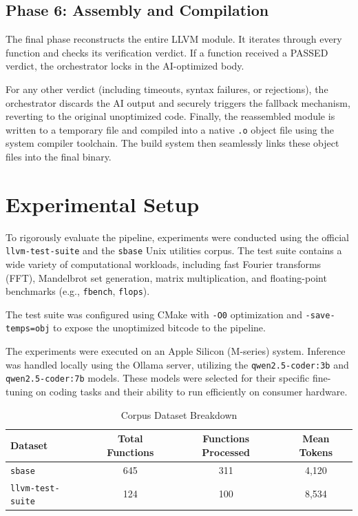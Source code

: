 \documentclass[conference,10pt]{IEEEtran}
\begin{document}
\subsection{Phase 6: Assembly and Compilation}
The final phase reconstructs the entire LLVM module. It iterates through every function and checks its verification verdict. If a function received a PASSED verdict, the orchestrator locks in the AI-optimized body. 

For any other verdict (including timeouts, syntax failures, or rejections), the orchestrator discards the AI output and securely triggers the fallback mechanism, reverting to the original unoptimized code. Finally, the reassembled module is written to a temporary file and compiled into a native \texttt{.o} object file using the system compiler toolchain. The build system then seamlessly links these object files into the final binary.

\section{Experimental Setup}
To rigorously evaluate the pipeline, experiments were conducted using the official \texttt{llvm-test-suite} and the \texttt{sbase} Unix utilities corpus. The test suite contains a wide variety of computational workloads, including fast Fourier transforms (FFT), Mandelbrot set generation, matrix multiplication, and floating-point benchmarks (e.g., \texttt{fbench}, \texttt{flops}). 

The test suite was configured using CMake with \texttt{-O0} optimization and \texttt{-save-temps=obj} to expose the unoptimized bitcode to the pipeline.

The experiments were executed on an Apple Silicon (M-series) system. Inference was handled locally using the Ollama server, utilizing the \texttt{qwen2.5-coder:3b} and \texttt{qwen2.5-coder:7b} models. These models were selected for their specific fine-tuning on coding tasks and their ability to run efficiently on consumer hardware.

\begin{table}[htbp]
\caption{Corpus Dataset Breakdown}
\label{tab:datasets}
\begin{center}
\begin{tabular}{|l|c|c|c|}
\hline
\textbf{Dataset} & \textbf{Total Functions} & \textbf{Functions Processed} & \textbf{Mean Tokens} \\
\hline
\texttt{sbase} & 645 & 311 & 4,120 \\
\texttt{llvm-test-suite} & 124 & 100 & 8,534 \\
\hline
\end{tabular}
\end{center}
\end{table}
\end{document}
